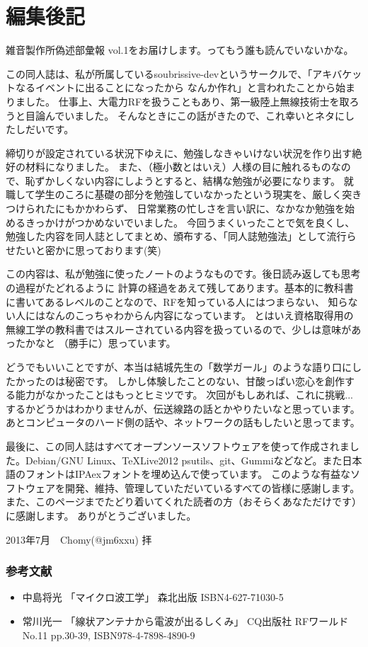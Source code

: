 \chapter*{編集後記}
雑音製作所偽述部彙報 vol.1をお届けします。ってもう誰も読んでいないかな。

この同人誌は、私が所属しているsoubrissive-devというサークルで、「アキバケットなるイベントに出ることになったから
なんか作れ」と言われたことから始まりました。
仕事上、大電力RFを扱うこともあり、第一級陸上無線技術士を取ろうと目論んでいました。
そんなときにこの話がきたので、これ幸いとネタにしたしだいです。

締切りが設定されている状況下ゆえに、勉強しなきゃいけない状況を作り出す絶好の材料になりました。
また、（極小数とはいえ）人様の目に触れるものなので、恥ずかしくない内容にしようとすると、結構な勉強が必要になります。
就職して学生のころに基礎の部分を勉強していなかったという現実を、厳しく突きつけられたにもかかわらず、
日常業務の忙しさを言い訳に、なかなか勉強を始めるきっかけがつかめないでいました。
今回うまくいったことで気を良くし、勉強した内容を同人誌としてまとめ、頒布する、「同人誌勉強法」として流行らせたいと密かに思っております(笑)

この内容は、私が勉強に使ったノートのようなものです。後日読み返しても思考の過程がたどれるように
計算の経過をあえて残してあります。基本的に教科書に書いてあるレベルのことなので、RFを知っている人にはつまらない、
知らない人にはなんのこっちゃわからん内容になっています。
とはいえ資格取得用の無線工学の教科書ではスルーされている内容を扱っているので、少しは意味があったかなと
（勝手に）思っています。

どうでもいいことですが、本当は結城先生の「数学ガール」のような語り口にしたかったのは秘密です。
しかし体験したことのない、甘酸っぱい恋心を創作する能力がなかったことはもっとヒミツです。
次回がもしあれば、これに挑戦...するかどうかはわかりませんが、伝送線路の話とかやりたいなと思っています。
あとコンピュータのハード側の話や、ネットワークの話もしたいと思ってます。

最後に、この同人誌はすべてオープンソースソフトウェアを使って作成されました。Debian/GNU Linux、\TeX Live2012
psutils、git、Gummiなどなど。また日本語のフォントはIPAexフォントを埋め込んで使っています。
このような有益なソフトウェアを開発、維持、管理していただいているすべての皆様に感謝します。
また、このページまでたどり着いてくれた読者の方（おそらくあなただけです）に感謝します。
ありがとうございました。

\begin{flushright}
2013年7月　Chomy(@jm6xxu) 拝
\end{flushright}

\subsection*{参考文献}
\begin{itemize}
  \item 中島将光
    「マイクロ波工学」 森北出版 ISBN4-627-71030-5
  \item 常川光一
    「線状アンテナから電波が出るしくみ」 CQ出版社 RFワールド No.11 pp.30-39, ISBN978-4-7898-4890-9
\end{itemize}